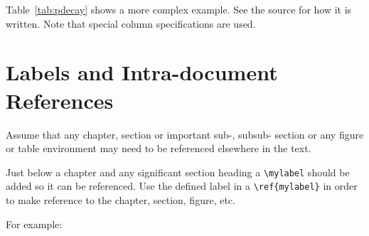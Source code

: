 Table~\ref{tab:pdecay} shows a more complex example.
See the source for how it is written.
Note that special column specifications are used.


\FloatBarrier



\section{Labels and Intra-document References}
\label{sec:intra-doc-ref}

Assume that any chapter, section or important sub-, subsub- section
or any figure or table environment may need to be referenced
elsewhere in the text. 

Just below a chapter and any significant section heading a
\verb|\mylabel| should be added so it can be referenced. Use the defined label in a \verb|\ref{mylabel}| in order to make reference
to the chapter, section, figure, etc.

For example:

